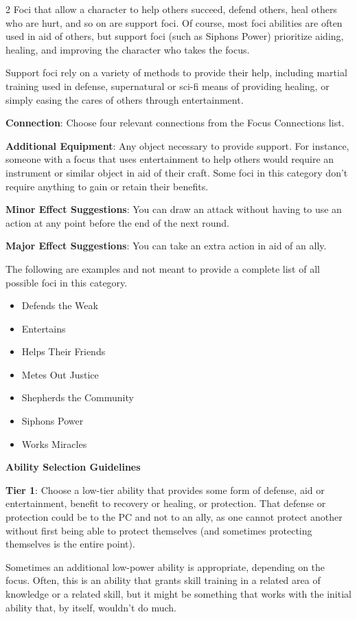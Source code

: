 \begin{multicols}{2}
Foci that allow a character to help others succeed, defend others, heal others who are hurt, and so on are support foci. Of course, most foci abilities are often used in aid of others, but support foci (such as Siphons Power) prioritize aiding, healing, and improving the character who takes the focus.

Support foci rely on a variety of methods to provide their help, including martial training used in defense, supernatural or sci-fi means of providing healing, or simply easing the cares of others through entertainment.

\textbf{Connection}: Choose four relevant connections from the Focus Connections list. 

\textbf{Additional Equipment}: Any object necessary to provide support. For instance, someone with a focus that uses entertainment to help others would require an instrument or similar object in aid of their craft. Some foci in this category don’t require anything to gain or retain their benefits.

\textbf{Minor Effect Suggestions}: You can draw an attack without having to use an action at any point before the end of the next round.

\textbf{Major Effect Suggestions}: You can take an extra action in aid of an ally.

The following are examples and not meant to provide a complete list of all possible foci in this category.

\begin{itemize} 
\item Defends the Weak
\item Entertains
\item Helps Their Friends
\item Metes Out Justice
\item Shepherds the Community
\item Siphons Power
\item Works Miracles
\end{itemize}

\textbf{Ability Selection Guidelines}

\textbf{Tier 1}: Choose a low-tier ability that provides some form of defense, aid or entertainment, benefit to recovery or healing, or protection. That defense or protection could be to the PC and not to an ally, as one cannot protect another without first being able to protect themselves (and sometimes protecting themselves is the entire point).

Sometimes an additional low-power ability is appropriate, depending on the focus. Often, this is an ability that grants skill training in a related area of knowledge or a related skill, but it might be something that works with the initial ability that, by itself, wouldn’t do much.


\end{multicols}
